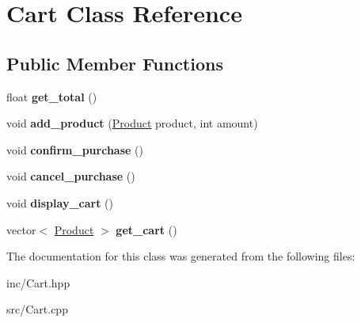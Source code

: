 \hypertarget{class_cart}{}\section{Cart Class Reference}
\label{class_cart}
\subsection*{Public Member Functions}
\begin{DoxyCompactItemize}
\item 
\mbox{\label{class_cart_a5af22f7bbef6b8adbe8a4257766efd7c}} 
float {\bfseries get\+\_\+total} ()
\item 
\mbox{\label{class_cart_a5e6d8f917c3557d1e7a105ce7895e357}} 
void {\bfseries add\+\_\+product} (\hyperlink{class_product}{Product} product, int amount)
\item 
\mbox{\label{class_cart_abb1e3eab6871d7ffc9e5f4bfbe93c432}} 
void {\bfseries confirm\+\_\+purchase} ()
\item 
\mbox{\label{class_cart_a0853b6965b78f8351accb06d1f126b05}} 
void {\bfseries cancel\+\_\+purchase} ()
\item 
\mbox{\label{class_cart_ac0d2c208bbcfe9136230b6e4f834be63}} 
void {\bfseries display\+\_\+cart} ()
\item 
\mbox{\label{class_cart_a3c920e9211900a4ee801ade96f7cd348}} 
vector$<$ \hyperlink{class_product}{Product} $>$ {\bfseries get\+\_\+cart} ()
\end{DoxyCompactItemize}


The documentation for this class was generated from the following files\+:\begin{DoxyCompactItemize}
\item 
inc/Cart.\+hpp\item 
src/Cart.\+cpp\end{DoxyCompactItemize}
